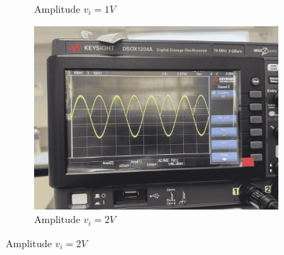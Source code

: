\begin{figure}[H]
\begin{subfigure}{0.3\linewidth}
            \caption{Amplitude $v_i=1V$}
            \label{wave:14-AC1}
        \end{subfigure}
        \begin{subfigure}{0.3\linewidth}
            \includegraphics[width=1\linewidth]{Experiment_14/Images/lab14_2v.png}
            \caption{Amplitude $v_i=2V$}
            \label{wave:14-AC2}
        \end{subfigure}


\end{figure}
